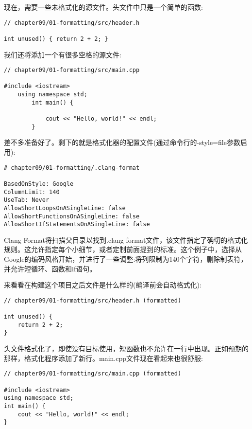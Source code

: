 现在，需要一些未格式化的源文件。头文件中只是一个简单的函数:

\begin{lstlisting}[style=styleCXX]
// chapter09/01-formatting/src/header.h

int unused() { return 2 + 2; }
\end{lstlisting}

我们还将添加一个有很多空格的源文件:

\begin{lstlisting}[style=styleCXX]
// chapter09/01-formatting/src/main.cpp

#include <iostream>
	using namespace std;
		int main() {
			
			cout << "Hello, world!" << endl;
		}
\end{lstlisting}

差不多准备好了。剩下的就是格式化器的配置文件(通过命令行的-{}style=file参数启用):

\begin{lstlisting}[style=stylePython]
# chapter09/01-formatting/.clang-format

BasedOnStyle: Google
ColumnLimit: 140
UseTab: Never
AllowShortLoopsOnASingleLine: false
AllowShortFunctionsOnASingleLine: false
AllowShortIfStatementsOnASingleLine: false
\end{lstlisting}

Clang Format将扫描父目录以找到.clang-format文件，该文件指定了确切的格式化规则。这允许指定每个小细节，或者定制前面提到的标准。这个例子中，选择从Google的编码风格开始，并进行了一些调整:将列限制为140个字符，删除制表符，并允许短循环、函数和if语句。

来看看在构建这个项目之后文件是什么样的(编译前会自动格式化):

\begin{lstlisting}[style=styleCXX]
// chapter09/01-formatting/src/header.h (formatted)

int unused() {
	return 2 + 2;
}
\end{lstlisting}

头文件格式化了，即使没有目标使用，短函数也不允许在一行中出现。正如预期的那样，格式化程序添加了新行。main.cpp文件现在看起来也很舒服:

\begin{lstlisting}[style=styleCXX]
// chapter09/01-formatting/src/main.cpp (formatted)

#include <iostream>
using namespace std;
int main() {
	cout << "Hello, world!" << endl;
}
\end{lstlisting}

